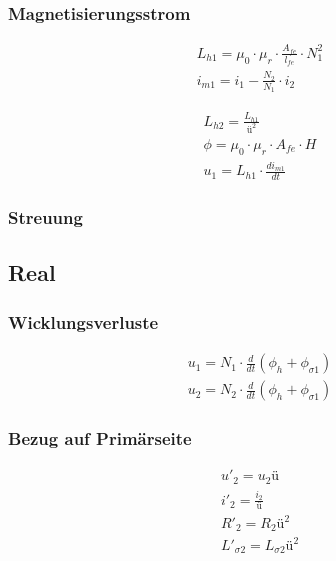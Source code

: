 \subsubsection{Magnetisierungsstrom}
{\setlength{\jot}{3pt}
\begin{gather*}
L_{h1} = \mu_0 \cdot \mu_r \cdot \frac{A_{fe}}{l_{fe}} \cdot N_1^2 \\
i_{m1} = i_1 - \frac{N_2}{N_1} \cdot i_2
\end{gather*}}

\columnbreak
{\setlength{\jot}{3pt}
\begin{gather*}
L_{h2} = \frac{L_{h1}}{\text{ü}^2} \\
\phi = \mu_0 \cdot \mu_r \cdot A_{fe} \cdot H \\
u_1 = L_{h1} \cdot \frac{di_{m1}}{dt}
\end{gather*}}

\subsubsection{Streuung}

\subsection{Real}
\subsubsection{Wicklungsverluste}
{\setlength{\jot}{3pt}
\begin{gather*}
u_1 = N_1 \cdot \frac{d}{dt}(\phi_h + \phi_{\sigma 1}) \\
u_2 = N_2 \cdot \frac{d}{dt}(\phi_h + \phi_{\sigma 1}) %
\end{gather*}}

\subsubsection{Bezug auf Primärseite}

\columnbreak
{}
{\setlength{\jot}{3pt}
\begin{gather*}
u'_2 = u_2 \text{ü} \\
i'_2 = \frac{i_2}{\text{ü}} \\
R'_2 = R_2 \text{ü}^2 \\
L'_{\sigma 2} = L_{\sigma 2} \text{ü}^2
\end{gather*}}

